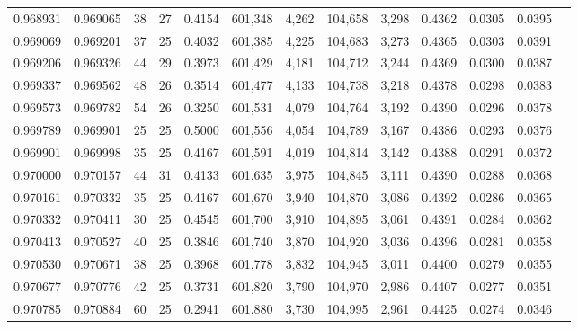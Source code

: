 \begin{tabular}{rrrrrrrrrrrrr}
0.968931 & 0.969065 &    38 &  27 &                                     0.4154 & 601,348 &   4,262 & 104,658 &   3,298 & 0.4362 & 0.0305 & 0.0395 \\
0.969069 & 0.969201 &    37 &  25 &                                     0.4032 & 601,385 &   4,225 & 104,683 &   3,273 & 0.4365 & 0.0303 & 0.0391 \\
0.969206 & 0.969326 &    44 &  29 &                                     0.3973 & 601,429 &   4,181 & 104,712 &   3,244 & 0.4369 & 0.0300 & 0.0387 \\
0.969337 & 0.969562 &    48 &  26 &                                     0.3514 & 601,477 &   4,133 & 104,738 &   3,218 & 0.4378 & 0.0298 & 0.0383 \\
0.969573 & 0.969782 &    54 &  26 &                                     0.3250 & 601,531 &   4,079 & 104,764 &   3,192 & 0.4390 & 0.0296 & 0.0378 \\
0.969789 & 0.969901 &    25 &  25 &                                     0.5000 & 601,556 &   4,054 & 104,789 &   3,167 & 0.4386 & 0.0293 & 0.0376 \\
0.969901 & 0.969998 &    35 &  25 &                                     0.4167 & 601,591 &   4,019 & 104,814 &   3,142 & 0.4388 & 0.0291 & 0.0372 \\
0.970000 & 0.970157 &    44 &  31 &                                     0.4133 & 601,635 &   3,975 & 104,845 &   3,111 & 0.4390 & 0.0288 & 0.0368 \\
0.970161 & 0.970332 &    35 &  25 &                                     0.4167 & 601,670 &   3,940 & 104,870 &   3,086 & 0.4392 & 0.0286 & 0.0365 \\
0.970332 & 0.970411 &    30 &  25 &                                     0.4545 & 601,700 &   3,910 & 104,895 &   3,061 & 0.4391 & 0.0284 & 0.0362 \\
0.970413 & 0.970527 &    40 &  25 &                                     0.3846 & 601,740 &   3,870 & 104,920 &   3,036 & 0.4396 & 0.0281 & 0.0358 \\
0.970530 & 0.970671 &    38 &  25 &                                     0.3968 & 601,778 &   3,832 & 104,945 &   3,011 & 0.4400 & 0.0279 & 0.0355 \\
0.970677 & 0.970776 &    42 &  25 &                                     0.3731 & 601,820 &   3,790 & 104,970 &   2,986 & 0.4407 & 0.0277 & 0.0351 \\
0.970785 & 0.970884 &    60 &  25 &                                     0.2941 & 601,880 &   3,730 & 104,995 &   2,961 & 0.4425 & 0.0274 & 0.0346 \\

\end{tabular}
